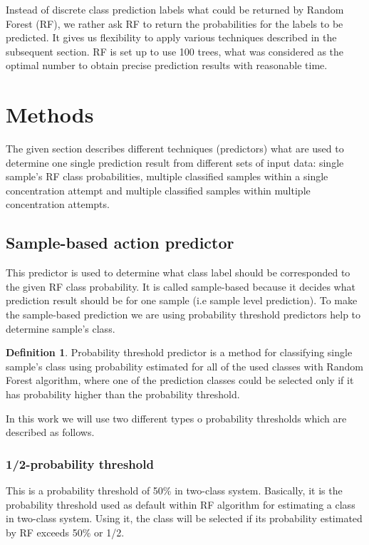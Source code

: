 \documentclass[12pt]{article}
\theoremstyle{definition}
\newtheorem{definition}{Definition}[section]
\begin{document}
Instead of discrete class prediction labels what could be returned by Random Forest (RF), we rather ask RF to return the probabilities for the labels to be predicted. It gives us flexibility to apply various techniques described in the subsequent section. RF is set up to use 100 trees, what was considered as the optimal number to obtain precise prediction results with reasonable time.

\newpage
\section{Methods} \label{methods}

The given section describes different techniques (predictors) what are used to determine one single prediction result from different sets of input data: single sample's RF class probabilities, multiple classified samples within a single concentration attempt and multiple classified samples within multiple concentration attempts. 

\subsection{Sample-based action predictor}

This predictor is used to determine what class label should be corresponded to the given RF class probability. It is called sample-based because it decides what prediction result should be for one sample (i.e sample level prediction). To make the sample-based prediction we are using probability threshold predictors help to determine sample's class.
\theoremstyle{definition}
\begin{definition}
Probability threshold predictor is a method for classifying single sample's class using probability estimated for all of the used classes with Random Forest algorithm, where one of the prediction classes could be selected only if it has probability higher than the probability threshold. 
\end{definition}
In this work we will use two different types o probability thresholds which are described as follows. 
\subsubsection{1/2-probability threshold}
This is a probability threshold of 50\% in two-class system. Basically, it is the probability threshold used as default within RF algorithm for estimating a class in two-class system. Using it, the class will be selected if its probability estimated by RF exceeds 50\% or 1/2.
\end{document}
